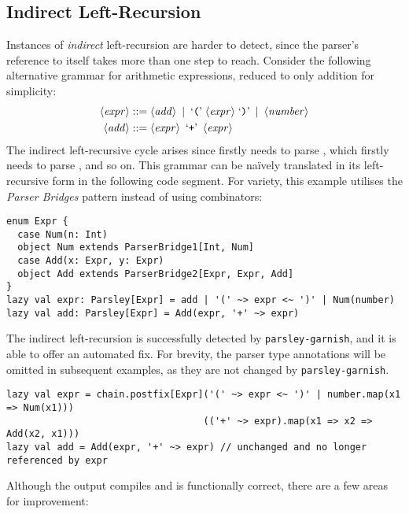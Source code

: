 \documentclass[../../main.tex]{subfiles}
\begin{document}
\subsection{Indirect Left-Recursion}
Instances of \emph{indirect} left-recursion are harder to detect, since the parser's reference to itself takes more than one step to reach.
Consider the following alternative grammar for arithmetic expressions, reduced to only addition for simplicity:
\begin{align*}
\langle \mathit{expr} \rangle &::= \langle \mathit{add} \rangle \enspace | \enspace \text{`\texttt{(}'} \; \langle \mathit{expr} \rangle \; \text{`\texttt{)}'} \enspace | \enspace \langle \mathit{number} \rangle \\
\langle \mathit{add} \rangle &::= \langle \mathit{expr} \rangle \enspace \text{`\texttt{+}'} \enspace \langle \mathit{expr} \rangle 
\end{align*}
%
The indirect left-recursive cycle arises since  firstly needs to parse , which firstly needs to parse , and so on.
This grammar can be naïvely translated in its left-recursive form in the following code segment.
For variety, this example utilises the \emph{Parser Bridges} pattern instead of using  combinators:
\begin{verbatim}
enum Expr {
  case Num(n: Int)
  object Num extends ParserBridge1[Int, Num]
  case Add(x: Expr, y: Expr)
  object Add extends ParserBridge2[Expr, Expr, Add]
}
lazy val expr: Parsley[Expr] = add | '(' ~> expr <~ ')' | Num(number)
lazy val add: Parsley[Expr] = Add(expr, '+' ~> expr)
\end{verbatim}
%
The indirect left-recursion is successfully detected by \texttt{parsley-garnish}, and it is able to offer an automated fix.
For brevity, the parser type annotations will be omitted in subsequent examples, as they are not changed by \texttt{parsley-garnish}.
\begin{verbatim}
lazy val expr = chain.postfix[Expr]('(' ~> expr <~ ')' | number.map(x1 => Num(x1)))
                                   (('+' ~> expr).map(x1 => x2 => Add(x2, x1)))
lazy val add = Add(expr, '+' ~> expr) // unchanged and no longer referenced by expr
\end{verbatim}
%
Although the output compiles and is functionally correct, there are a few areas for improvement:
\end{document}
